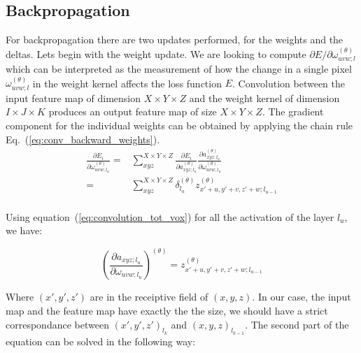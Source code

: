 \documentclass[final, paper=letter,5p,times,twocolumn]{elsarticle}
\begin{document}
\subsection{Backpropagation}

For backpropagation there are two updates performed, for the weights and the deltas. Lets begin with the weight update. We are looking to compute $\partial E / \partial \omega_{uvw;l}^{(\theta)}$ which can be interpreted as the measurement of how the change in a single pixel $\omega_{uvw;l}^{(\theta)}$ in the weight kernel affects the loss function $E$. Convolution between the input feature map of dimension $X \times Y \times Z$  and the weight kernel of dimension $I \times J \times K$ produces an output feature map of size $X \times Y \times Z$. The gradient component for the individual weights can be obtained by applying the chain rule Eq.~(\ref{eq:conv_backward_weights}).\\


\begin{equation}
  \begin{split}
    \frac{\partial E_{i}}{\partial \omega_{uvw;l_{u}}^{(\theta)}} =& \sum_{xyz}^{X \times Y \times Z} \frac{\partial E_{i}}{\partial a_{xyz;l_{u}}^{(\theta)}}\frac{\partial a_{xyz;l_{u}}^{(\theta)}}{\partial \omega_{uvw;l_{u}}^{(\theta)}}  \\
    =& \sum_{xyz}^{X \times Y \times Z} \delta_{l_{u}}^{(\theta)}z_{x'+u,y'+v,z'+w;l_{u-1}}^{(\theta)} \\
  \end{split}
  \label{eq:conv_backward_weights} 
\end{equation}

Using equation~(\ref{eq:convolution_tot_vox}) for all the activation of the layer $l_{u}$, we have:

\begin{equation*}
    \left( \frac{\partial a_{xyz;l_{u}}}{\partial \omega_{uvw;l_{u}}} \right)^{(\theta)} = z_{x'+u,y'+v,z'+w;l_{u-1}}^{(\theta)}
\end{equation*}

Where $(x',y',z')$ are in the receiptive field of $(x,y,z)$. In our case, the input map and the feature map have exactly the the size, we should have a strict correspondance between $(x',y',z')_{l_{k}}$ and $(x,y,z)_{l_{k-1}}$. The second part of the equation can be solved in the following way:
\end{document}
